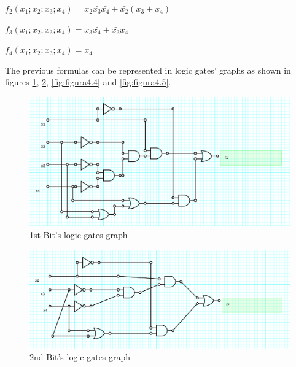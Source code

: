 \begin{center}
$f_{2}(x_{1};x_{2};x_{3};x_{4})=x_{2}\bar{x_{3}}\bar{x_{4}}+\bar{x_{2}}(x_{3}+x_{4})$
\par\end{center}

\begin{center}
$f_{3}(x_{1};x_{2};x_{3};x_{4})=x_{3}\bar{x_{4}}+\bar{x_{3}}x_{4}$
\par\end{center}

\begin{center}
$f_{4}(x_{1};x_{2};x_{3};x_{4})=x_{4}$
\par\end{center}

The previous formulas can be represented in logic gates' graphs as shown in figures \ref{fig:figura4.2},
\ref{fig:figura4.3}, \ref{fig:figura4.4} and \ref{fig:figura4.5}.

\begin{figure}[h!] %
\begin{centering}
\includegraphics[scale=0.25]{../E4TP1/images/1}
\par\end{centering}
\caption{\color{cyan}1st Bit's logic gates graph}
\label{fig:figura4.2}
\end{figure}

\begin{figure}[h!]%
\begin{centering}
\includegraphics[scale=0.25]{../E4TP1/images/2}
\par\end{centering}
\caption{\color{cyan}2nd Bit's logic gates graph}
\label{fig:figura4.3}
\end{figure}

